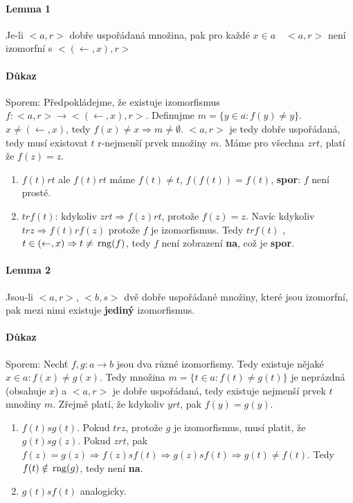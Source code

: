\documentclass[a4paper,12pt,titlepage]{article}
\begin{document}
\paragraph{Lemma 1}
Je-li $<a,r>$ dobře uspořádaná množina, pak pro každé $x \in a \quad <a, r>$ není
izomorfní s $<(\leftarrow, x), r>$
\paragraph{Důkaz}
Sporem: Předpokládejme, že existuje izomorfismus $f: <a,r> \to <(\leftarrow, x),
r>$. Definujme $m = \{ y \in a: f(y) \neq y \}$. $x \neq (\leftarrow, x)$, tedy
$f(x) \neq x\Rightarrow m \neq \emptyset$. $<a,r>$ je tedy dobře uspořádaná,
tedy musí existovat $t$ r-nejmenší prvek množiny $m$. Máme pro všechna $z r t$,
platí že $f(z) = z$.
\begin{enumerate}
	\item $f(t) r t$ ale $f(t) r t$ máme $f(t) \neq t$, $f(f(t)) = f(t)$,
	\textbf{spor}: $f$ není prosté.
	\item $t r f(t)$: kdykoliv $z r t \Rightarrow f(z) r t$, protože $f(z) = z$.
	Navíc kdykoliv $t r z \Rightarrow f(t) r f(z)$ protože $f$ je izomorfismus.
	Tedy $t r f(t)$ , $t \in (\leftarrow, x) \Rightarrow t \neq \operatorname*{\,rng}(f)$, tedy
	$f$ není zobrazení \textbf{na}, což je \textbf{spor}.
\end{enumerate}
\paragraph{Lemma 2}
Jsou-li $<a,r>$, $<b,s>$ dvě dobře uspořádané množiny, které jsou izomorfní, pak
mezi nimi existuje \textbf{jediný} izomorfismus.
\paragraph{Důkaz}
Sporem: Nechť $f, g: a \to b$ jsou dva různé izomorfismy. Tedy existuje nějaké 
$x \in a: f(x) \neq g(x)$. Tedy množina $m = \{ t \in a: f(t) \neq g(t) \}$ je
neprázdná (obsahuje $x$) a $<a,r>$ je dobře uspořádaná, tedy existuje nejmenší
prvek $t$ množiny $m$. Zřejmě platí, že kdykoliv $y r t$, pak $f(y) = g(y)$.
\begin{enumerate}
	\item $f(t) s g(t)$. Pokud $t r z$, protože $g$ je izomorfismus, musí platit,
	že $g(t) s g(z)$. Pokud $z r t$, pak $f(z) = g(z) \Rightarrow f(z) s f(t)
	\Rightarrow g(z) s f(t) \Rightarrow g(t) \neq f(t)$. Tedy $f(t) \notin
	\operatorname*{\,rng}(g)$, tedy není \textbf{na}.
	\item $g(t) s f(t)$ analogicky.
\end{enumerate}
\end{document}
